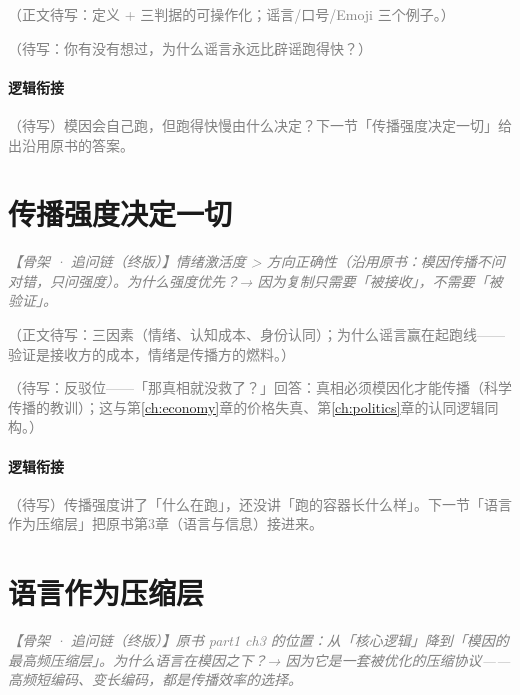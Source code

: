 \documentclass[../../main2.tex]{subfiles}
\begin{document}
	\textcolor{gray}{（正文待写：定义 + 三判据的可操作化；谣言/口号/Emoji 三个例子。）}

	\begin{readingnote}
		\textcolor{gray}{（待写：你有没有想过，为什么谣言永远比辟谣跑得快？）}
	\end{readingnote}

	\paragraph*{逻辑衔接}
	\textcolor{gray}{（待写）模因会自己跑，但跑得快慢由什么决定？下一节「传播强度决定一切」给出沿用原书的答案。}

	\section{传播强度决定一切}
	\label{sec:meme-intensity}

	\textcolor{gray}{\textit{【骨架 · 追问链（终版）】情绪激活度 > 方向正确性（沿用原书：模因传播不问对错，只问强度）。为什么强度优先？→ 因为复制只需要「被接收」，不需要「被验证」。}}

	\textcolor{gray}{（正文待写：三因素（情绪、认知成本、身份认同）；为什么谣言赢在起跑线——验证是接收方的成本，情绪是传播方的燃料。）}

	\begin{questionbox}
		\textcolor{gray}{（待写：反驳位——「那真相就没救了？」回答：真相必须模因化才能传播（科学传播的教训）；这与第\ref{ch:economy}章的价格失真、第\ref{ch:politics}章的认同逻辑同构。）}
	\end{questionbox}

	\paragraph*{逻辑衔接}
	\textcolor{gray}{（待写）传播强度讲了「什么在跑」，还没讲「跑的容器长什么样」。下一节「语言作为压缩层」把原书第3章（语言与信息）接进来。}

	\section{语言作为压缩层}
	\label{sec:meme-language}

	\textcolor{gray}{\textit{【骨架 · 追问链（终版）】原书 part1 ch3 的位置：从「核心逻辑」降到「模因的最高频压缩层」。为什么语言在模因之下？→ 因为它是一套被优化的压缩协议——高频短编码、变长编码，都是传播效率的选择。}}
\end{document}
